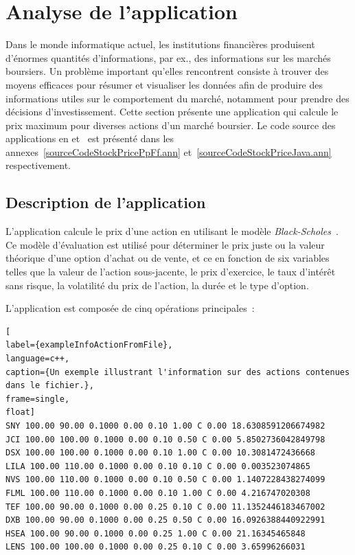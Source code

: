 

\section{Analyse de l'application }
\label{stockprice.sect}


Dans le monde informatique actuel, les institutions financi\`eres produisent d'\'enormes quantit\'es d'informations, par ex., des informations sur les march\'es boursiers. Un probl\`eme important qu'elles rencontrent consiste \`a trouver des moyens efficaces pour r\'esumer et visualiser les donn\'ees afin de produire des informations utiles sur le comportement du march\'e, notamment pour prendre des d\'ecisions d'investissement. Cette section pr\'esente une application qui calcule le prix maximum pour diverses actions d'un marché boursier. Le code source des applications  en  et~ est pr\'esent\'e dans les annexes~\ref{sourceCodeStockPricePpFf.ann} et~\ref{sourceCodeStockPriceJava.ann} respectivement. 

\subsection{Description de l'application}

L'application  calcule le prix d'une action en utilisant le modèle \emph{Black-Scholes}~\citep{macbeth1979empirical}. Ce mod\`ele d'\'evaluation est utilis\'e pour d\'eterminer le prix juste ou la valeur th\'eorique d'une option d'achat ou de vente, et ce en fonction de six variables telles que la valeur de l'action sous-jacente, le prix d'exercice, le taux d'int\'er\^et sans risque, la volatilit\'e du prix de l'action, la dur\'ee et le type d'option. 

L'application  est compos\'ee de cinq op\'erations principales~: 

\begin{lstlisting}[
label={exampleInfoActionFromFile},
language=c++,
caption={Un exemple illustrant l'information sur des actions contenues dans le fichier.},
frame=single,
float]
SNY 100.00 90.00 0.1000 0.00 0.10 1.00 C 0.00 18.6308591206674982
JCI 100.00 100.00 0.1000 0.00 0.10 0.50 C 0.00 5.8502736042849798
DSX 100.00 100.00 0.1000 0.00 0.10 1.00 C 0.00 10.3081472436668
LILA 100.00 110.00 0.1000 0.00 0.10 0.10 C 0.00 0.003523074865
NVS 100.00 110.00 0.1000 0.00 0.10 0.50 C 0.00 1.1407228438274099
FLML 100.00 110.00 0.1000 0.00 0.10 1.00 C 0.00 4.216747020308
TEF 100.00 90.00 0.1000 0.00 0.25 0.10 C 0.00 11.1352446183467002
DXB 100.00 90.00 0.1000 0.00 0.25 0.50 C 0.00 16.0926388440922991
HSEA 100.00 90.00 0.1000 0.00 0.25 1.00 C 0.00 21.16345465848
LENS 100.00 100.00 0.1000 0.00 0.25 0.10 C 0.00 3.65996266031
\end{lstlisting}


